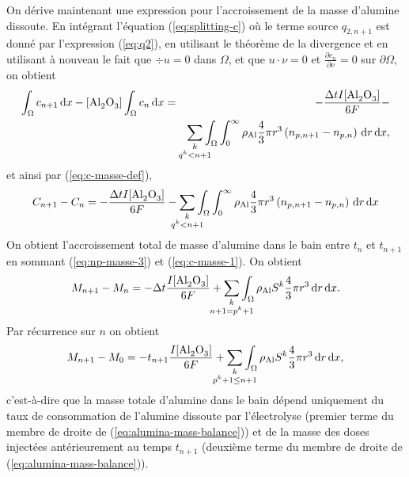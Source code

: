 On dérive maintenant une expression pour l'accroissement de la masse
d'alumine dissoute. En intégrant l'équation (\ref{eq:splitting-c}) où
le terme source $q_{2,n+1}$ est donné par l'expression (\ref{eq:q2}),
en utilisant le théorème de la divergence et en utilisant à nouveau le
fait que $\div u = 0$ dans $\Omega$, et que $u\cdot \nu = 0$ et
$\frac{\partial c_n}{\partial \nu} = 0$ sur $\partial \Omega$, on
obtient
\begin{eqnarray*}
[\cee{Al2O3}]\int_\Omega c_{n+1}\intd{x} - [\cee{Al2O3}] \int_\Omega
c_n\intd{x} &=& -\frac{\dt I [\cee{Al2O3}]}{6\faraday} - \\
&&\sum_{\mathclap{\substack{k \\ q^k < n+1}}}
\int_\Omega\int_0^\infty\aluminadensity \frac{4}{3}\pi
r^3 \parent{n_{p,n+1} - n_{p,n}}\intd{r}\intd{x},\nonumber\\
\end{eqnarray*}
et ainsi par (\ref{eq:c-masse-def}),
\begin{eqnarray}
  C_{n+1} - C_n = -\frac{\dt I [\cee{Al2O3}]}{6\faraday} -
\sum_{\mathclap{\substack{k \\ q^k < n+1}}}
\int_\Omega\int_0^\infty\aluminadensity \frac{4}{3}\pi
r^3 \parent{n_{p,n+1} - n_{p,n}}\intd{r}\intd{x}\label{eq:c-masse-1}
\end{eqnarray}
On obtient l'accroissement total de masse d'alumine dans le bain entre
$t_n$ et $t_{n+1}$ en sommant (\ref{eq:np-masse-3}) et
(\ref{eq:c-masse-1}). On obtient
\begin{equation}
  M_{n+1} - M_{n} = - \dt \frac{I[\cee{Al2O3}]}{6\faraday} +
  \sum_{\mathclap{\substack{k\\ n+1 = p^k + 1}}} \int_\Omega
  \aluminadensity S^k\frac{4}{3}\pi r^3 \intd{r}\intd{x}.
\end{equation}
Par récurrence sur $n$ on obtient
\begin{equation}\label{eq:alumina-mass-balance}
  M_{n+1} - M_{0} = - t_{n+1} \frac{I[\cee{Al2O3}]}{6\faraday} +
  \sum_{\mathclap{\substack{k\\  p^k + 1 \leq n+1}}} \int_\Omega
  \aluminadensity S^k\frac{4}{3}\pi r^3 \intd{r}\intd{x},
\end{equation}
c'est-à-dire que la masse totale d'alumine dans le bain dépend
uniquement du taux de consommation de l'alumine dissoute par
l'électrolyse (premier terme du membre de droite de
(\ref{eq:alumina-mass-balance})) et de la masse des doses
injectées antérieurement au temps $t_{n+1}$ (deuxième terme du membre
de droite de (\ref{eq:alumina-mass-balance})).

